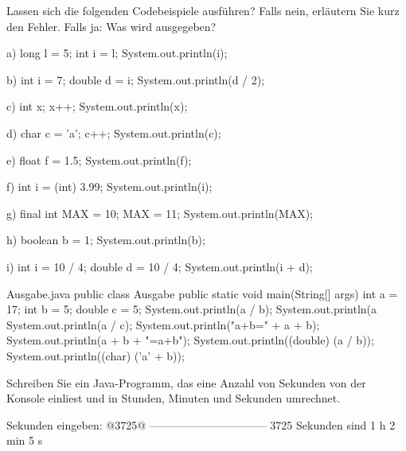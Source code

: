 Lassen sich die folgenden Codebeispiele ausführen? Falls nein, erläutern Sie kurz den Fehler. Falls ja: Was wird ausgegeben?
\begin{tcbraster}[raster columns=3, raster equal height=rows, raster column skip=3mm, raster row skip=1mm]
\begin{javacode}[Ausschnitt]{a)}
long l = 5;
int i = l;
System.out.println(i);
\end{javacode}
\begin{javacode}[Ausschnitt]{b)}
int i = 7;
double d = i;
System.out.println(d / 2);
\end{javacode}
\begin{javacode}[Ausschnitt]{c)}
int x;
x++;
System.out.println(x);
\end{javacode}
\begin{javacode}[Ausschnitt]{d)}
char c = 'a';
c++;
System.out.println(c);
\end{javacode}
\begin{javacode}[Ausschnitt]{e)}
float f = 1.5;
System.out.println(f);
\end{javacode}
\begin{javacode}[Ausschnitt]{f)}
int i = (int) 3.99;
System.out.println(i);
\end{javacode}
\begin{javacode}[Ausschnitt]{g)}
final int MAX = 10;
MAX = 11;
System.out.println(MAX);
\end{javacode}
\begin{javacode}[Ausschnitt]{h)}
boolean b = 1;
System.out.println(b);
\end{javacode}
\begin{javacode}[Ausschnitt]{i)}
int i = 10 / 4;
double d = 10 / 4;
System.out.println(i + d);
\end{javacode}
\end{tcbraster}

\begin{javacode}{Ausgabe.java}
public class Ausgabe {
	public static void main(String[] args) {
		int a = 17;
		int b = 5;
		double c = 5;
		System.out.println(a / b);
		System.out.println(a %
		System.out.println(a / c);
		System.out.println("a+b=" + a + b);
		System.out.println(a + b + "=a+b");
		System.out.println((double) (a / b));
		System.out.println((char) ('a' + b));
	}
}
\end{javacode}

Schreiben Sie ein Java-Programm, das eine Anzahl von Sekunden von der Konsole einliest und in Stunden, Minuten und Sekunden umrechnet.
\begin{konsole}
Sekunden eingeben:
@3725@
--------------------------------
3725 Sekunden sind 1 h 2 min 5 s
\end{konsole}

